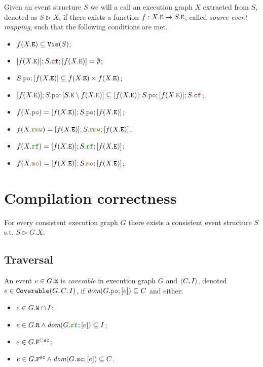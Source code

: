 \documentclass[12pt]{article}
\begin{document}
\begin{definition}
  Given an event structure $S$ we will a call an execution graph $X$
  extracted from $S$, denoted as $S \rhd X$,
  if there exists a function $f : X.{\mathtt{E}} \rightarrow S.{\mathtt{E}}$, called \emph{source event mapping},
  such that the following conditions are met.
  \begin{itemize}
    \item $f(X.{\mathtt{E}}) \subseteq {\mathtt{Vis}}(S)$;
    \item $[f(X.\lE)];S.\lCF;[f(X.\lE)] = \emptyset$;
    \item $S.\lPO;[f(X.\lE)] \subseteq f(X.\lE) \times f(X.\lE)$;
    \item $[f(X.\lE)];S.\lPO;[S.\lE \setminus f(X.\lE)] \subseteq
           [f(X.\lE)];S.\lPO;[f(X.\lE)];S.\lCF$;
    \item $f(X.\lPO)  = [f(X.\lE)];S.\lPO; [f(X.\lE)]$;
    \item $f(X.\lRMW) = [f(X.\lE)];S.\lRMW;[f(X.\lE)]$;
    \item $f(X.\lRF)  = [f(X.\lE)];S.\lRF; [f(X.\lE)]$;
    \item $f(X.\lMO)  = [f(X.\lE)];S.\lMO; [f(X.\lE)]$;
  \end{itemize}
\end{definition}

\section{Compilation correctness}

\begin{theorem}
  For every consistent \imm execution graph $G$
  there exists a consistent event structure $S$
  s.t. $S \rhd G.X$.
\end{theorem}

\subsection{Traversal}

\begin{definition}
  An event $e \in G.{\mathtt{E}}$ is \emph{coverable} in \imm execution graph $G$ and $\langle C, I \rangle$,
  denoted $e \in {\mathtt{Coverable}}(G, C, I)$, 
  if $\dom{G.\lPO;[e]} \subseteq C$ and either:
  \begin{itemize}
    \item $e \in G.{\mathtt{W}} \cap I$;
    \item $e \in G.\lR \wedge \dom{G.\lRF;[e]} \subseteq I$;
    \item $e \in G.{\mathtt{F}}^{\sqsubset{\mathtt{sc}}}$;
    \item $e \in G.\lF^{\sco} \wedge \dom{G.\lSC;[e]} \subseteq C$.
  \end{itemize}
\end{definition}
\end{document}
